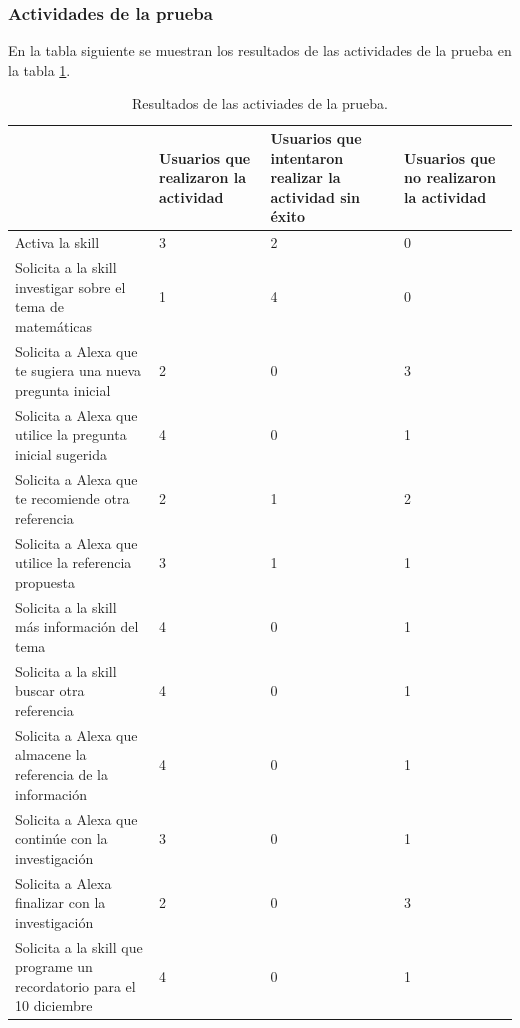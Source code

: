 
\subsubsection{Actividades de la prueba}
\label{ActividadesPruebacapIV}

En la tabla siguiente se muestran los resultados de las actividades de la prueba en la tabla \ref{tab:t43}.

\begin{table}
  \begin{center}
    \begin{tabular}{ | p{7cm} | p{3cm} | p{3cm} | p{3cm} | }
      \hline
       & Usuarios que realizaron la actividad & Usuarios que intentaron realizar la actividad sin éxito & Usuarios que no realizaron la actividad \\ \hline
      Activa la skill & 3 & 2 & 0 \\ \hline
      Solicita a la skill investigar sobre el tema de matemáticas & 1 & 4 & 0 \\ \hline
      Solicita a Alexa que te sugiera una nueva pregunta inicial & 2 & 0 & 3 \\ \hline
      Solicita a Alexa que utilice la pregunta inicial sugerida & 4 & 0 & 1 \\ \hline
      Solicita a Alexa que te recomiende otra referencia & 2 & 1 & 2 \\ \hline
      Solicita a Alexa que utilice la referencia propuesta & 3 & 1 & 1 \\ \hline
      Solicita a la skill más información del tema & 4 & 0 & 1 \\ \hline
      Solicita a la skill buscar otra referencia & 4 & 0 & 1 \\ \hline
      Solicita a Alexa que almacene la referencia de la información & 4 & 0 & 1 \\ \hline
      Solicita a Alexa que continúe con la investigación & 3 & 0 & 1 \\ \hline
      Solicita a Alexa finalizar con la investigación & 2 & 0 & 3 \\ \hline
      Solicita a la skill que programe un recordatorio para el 10 diciembre & 4 & 0 & 1 \\ \hline
    \end{tabular}
    \caption{Resultados de las activiades de la prueba.}
    \label{tab:t43}
  \end{center}
\end{table}

